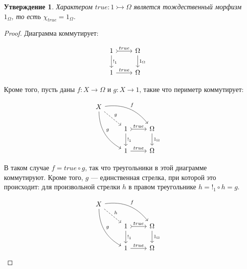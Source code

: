 \documentclass[a4paper, 12pt]{article}
\newtheorem{exercise}{Утверждение}
\begin{document}
\begin{exercise}
Характером $true\colon 1\rightarrowtail \Omega$ является тождественный морфизм $1_\Omega$, 
то есть $\chi_{true} = 1_\Omega$.
\end{exercise}
\begin{proof}
Диаграмма коммутирует:

\[
\begin{tikzcd}
1 \arrow{d}{!_1} \arrow[tail]{r}{true}
& \Omega \arrow{d}{1_\Omega} \\
1 \arrow{r}{true}
& \Omega
\end{tikzcd}
\]

Кроме того, пусть даны $f\colon X\to \Omega$ и $g\colon X\to 1$, такие что
периметр коммутирует:

\[
\begin{tikzcd}
X
\arrow[bend left]{drr}{f}
\arrow[bend right]{ddr}{g}
\arrow[dashrightarrow]{dr}{g}
& & \\
& 1 \arrow{d}{!_1} \arrow[tail]{r}{true}
& \Omega \arrow{d}{1_\Omega} \\
& 1 \arrow{r}{true}
& \Omega
\end{tikzcd}
\]

В таком случае $f = true\circ g$, так что треугольники в 
этой диаграмме коммутируют. Кроме того, $g$ --- единственная
стрелка, при которой это происходит: для произвольной стрелки $h$
в правом треугольнике $h = !_1\circ h = g$.

\[
\begin{tikzcd}
X
\arrow[bend left]{drr}{f}
\arrow[bend right]{ddr}{g}
\arrow[dashrightarrow]{dr}{h}
& & \\
& 1 \arrow{d}{!_1} \arrow[tail]{r}{true}
& \Omega \arrow{d}{1_\Omega} \\
& 1 \arrow{r}{true}
& \Omega
\end{tikzcd}
\]

\end{proof}
\end{document}
